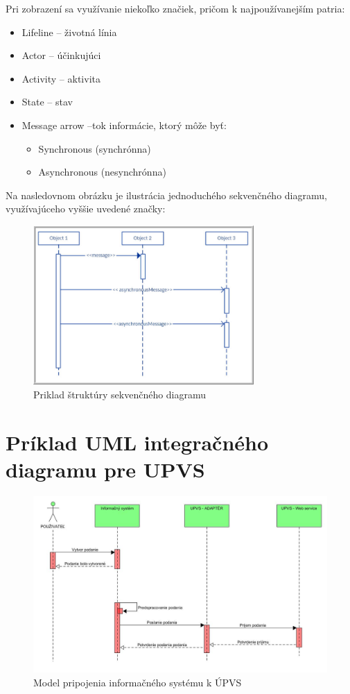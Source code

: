 \documentclass[10pt,twoside,slovak,a4paper]{article}
\begin{document}
Pri zobrazení sa využívanie niekoľko značiek, pričom k najpoužívanejším patria:
\begin{itemize}
	\item Lifeline – životná línia
	\item Actor – účinkujúci
	\item Activity – aktivita
	\item State – stav
	\item Message arrow –tok informácie, ktorý môže byť:
		\begin{itemize}
		\item Synchronous (synchrónna)
		\item Asynchronous (nesynchrónna)
		\end{itemize}
\end{itemize}

Na nasledovnom obrázku je ilustrácia jednoduchého sekvenčného diagramu, využívajúceho vyššie uvedené značky\cite{SDT}:
\begin{figure}[h]
\centering
\includegraphics[width=0.75\textwidth]{Images/Obr2.jpg}
\caption{Priklad štruktúry sekvenčného diagramu}
\label{Strukt}
\end{figure}



\section{Príklad UML integračného diagramu pre UPVS} \label{4sek}

\begin{figure}[h!]
\centering
\includegraphics[width=\textwidth]{Images/Obr3.jpg}
\caption{Model pripojenia informačného systému k ÚPVS}
\label{Model}
\end{figure}
\end{document}

